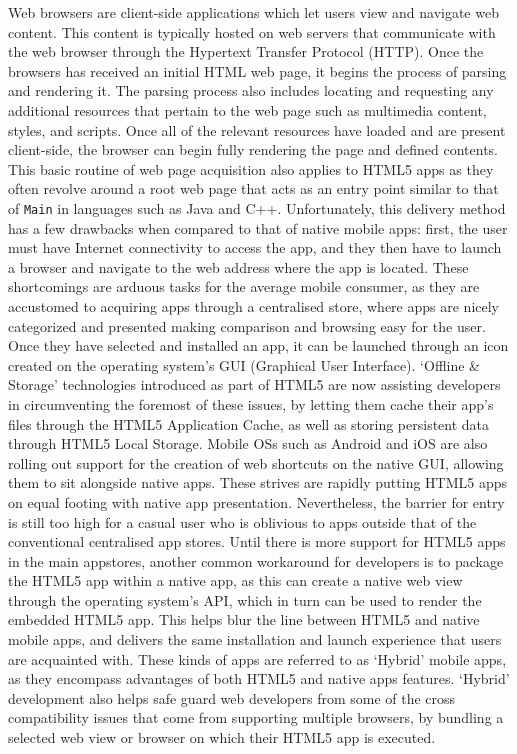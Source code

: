 \documentclass[final]{cmpreport}
\begin{document}
Web browsers are client-side applications which let users view and navigate web content. This content is typically hosted on web servers that communicate with the web browser through the Hypertext Transfer Protocol (HTTP). Once the browsers has received an initial HTML web page, it begins the process of parsing and rendering it. The parsing process also includes locating and requesting any additional resources that pertain to the web page such as multimedia content, styles, and scripts. Once all of the relevant resources have loaded and are present client-side, the browser can begin fully rendering the page and defined contents. This basic routine of web page acquisition also applies to HTML5 apps as they often revolve around a root web page that acts as an entry point similar to that of \texttt{Main} in languages such as Java and C++. Unfortunately, this delivery method has a few drawbacks when compared to that of native mobile apps: first, the user must have Internet connectivity to access the app, and they then have to launch a browser and navigate to the web address where the app is located. These shortcomings are arduous tasks for the average mobile consumer, as they are accustomed to acquiring apps through a centralised store, where apps are nicely categorized and presented making comparison and browsing easy for the user. Once they have selected and installed an app, it can be launched through an icon created on the operating system's GUI (Graphical User Interface). `Offline \& Storage' technologies introduced as part of HTML5 are now assisting developers in circumventing the foremost of these issues, by letting them cache their app's files through the HTML5 Application Cache, as well as storing persistent data through HTML5 Local Storage. Mobile OSs such as Android and iOS are also rolling out support for the creation of web shortcuts on the native GUI, allowing them to sit alongside native apps. These strives are rapidly putting HTML5 apps on equal footing with native app presentation. Nevertheless, the barrier for entry is still too high for a casual user who is oblivious to apps outside that of the conventional centralised app stores. Until there is more support for HTML5 apps in the main appstores, another common workaround for developers is to package the HTML5 app within a native app, as this can create a native web view through the operating system's API, which in turn can be used to render the embedded HTML5 app. This helps blur the line between HTML5 and native mobile apps, and delivers the same installation and launch experience that users are acquainted with. These kinds of apps are referred to as `Hybrid' mobile apps, as they encompass advantages of both HTML5 and native apps features. `Hybrid' development also helps safe guard web developers from some of the cross compatibility issues that come from supporting multiple browsers, by bundling a selected web view or browser on which their HTML5 app is executed.
\end{document}
